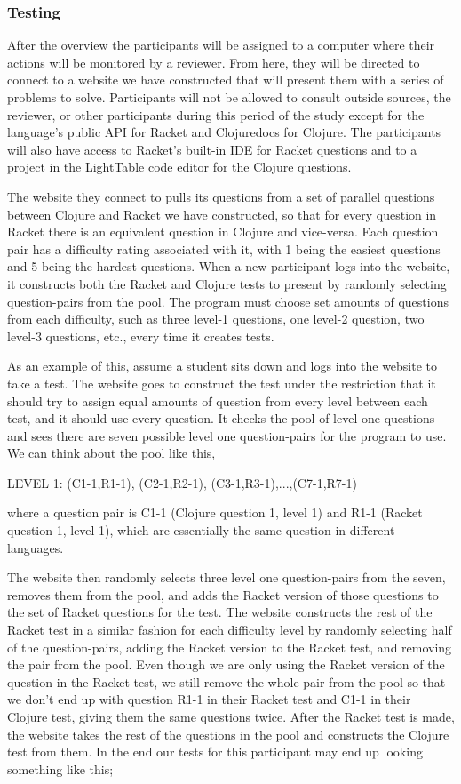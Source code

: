 \documentclass[submission,copyright,creativecommons]{eptcs}
\begin{document}
\subsubsection{Testing}\label{subsec:testing}

After the overview the participants will be assigned to a computer where their actions will be monitored by a reviewer. 
From here, they will be directed to connect to a website we have constructed that will present them with a series of problems to solve. 
Participants will not be allowed to consult outside sources, the reviewer, or other participants during this period of the study except for the language's public API for Racket and Clojuredocs for Clojure.
The participants will also have access to Racket's built-in IDE for Racket questions and to a project in the LightTable code editor for the Clojure questions. 

The website they connect to pulls its questions from a set of parallel questions between Clojure and Racket we have constructed, so that for every question in Racket there is an equivalent question in Clojure and vice-versa.
Each question pair has a difficulty rating associated with it, with 1 being the easiest questions and 5 being the hardest questions.
When a new participant logs into the website, it constructs both the Racket and Clojure tests to present by randomly selecting question-pairs from the pool. 
The program must choose set amounts of questions from each difficulty, such as three level-1 questions, one level-2 question, two level-3 questions, etc., every time it creates tests. 

As an example of this, assume a student sits down and logs into the website to take a test.
The website goes to construct the test under the restriction that it should try to assign equal amounts of question from every level between each test, and it should use every question. 
It checks the pool of level one questions and sees there are seven possible level one question-pairs for the program to use.
We can think about the pool like this,

LEVEL 1: (C1-1,R1-1), (C2-1,R2-1), (C3-1,R3-1),...,(C7-1,R7-1)

where a question pair is C1-1 (Clojure question 1, level 1) and R1-1 (Racket question 1, level 1), which are essentially the same question in different languages.

The website then randomly selects three level one question-pairs from the seven, removes them from the pool, and adds the Racket version of those questions to the set of Racket questions for the test.
The website constructs the rest of the Racket test in a similar fashion for each difficulty level by randomly selecting half of the question-pairs, adding the Racket version to the  Racket test, and removing the pair from the pool.
Even though we are only using the Racket version of the question in the Racket test, we still remove the whole pair from the pool so that we don't end up with question R1-1 in their Racket test and C1-1 in their Clojure test, giving them the same questions twice. 
After the Racket test is made, the website takes the rest of the questions in the pool and constructs the Clojure test from them.
In the end our tests for this participant may end up looking something like this; 
\end{document}
